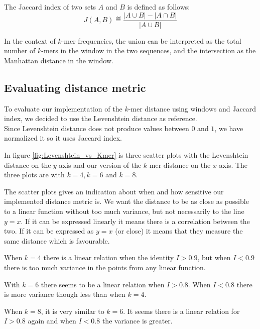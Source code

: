 The Jaccard index of two sets $A$ and $B$ is defined as follows:
\begin{equation}
  J(A, B) \eqdef \frac{|A \cup B| - |A \cap B|}{|A \cup B|}
\end{equation}

In the context of $k$-mer frequencies, the union can be interpreted as the
total number of $k$-mers in the window in the two sequences, and the
intersection as the Manhattan distance in the window.


\subsection{Evaluating distance metric}
To evaluate our implementation of the $k$-mer distance using windows and
Jaccard index, we decided to use the Levenshtein distance as reference.\\ Since
Levenshtein distance does not produce values between $0$ and $1$, we have
normalized it so it uses Jaccard index.

In figure \ref{fig:Levenshtein_vs_Kmer} is three scatter plots with the
Levenshtein distance on the $y$-axis and our version of the $k$-mer distance on
the $x$-axis. The three plots are with $k=4, k=6$ and $k=8$.

The scatter plots gives an indication about when and how sensitive our
implemented distance metric is. We want the distance to be as close as possible
to a linear function without too much variance, but not necessarily to the line
$y=x$. If it can be expressed linearly it means there is a correlation between
the two. If it can be expressed as $y=x$ (or close) it means that they measure
the same distance which is favourable.

When $k=4$ there is a linear relation when the identity $I>0.9$, but when
$I<0.9$ there is too much variance in the points from any linear function.

With $k=6$ there seems to be a linear relation when $I>0.8$. When $I<0.8$ there
is more variance though less than when $k=4$.

When $k=8$, it is very similar to $k=6$. It seems there is a linear relation
for $I>0.8$ again and when $I<0.8$ the variance is greater.

